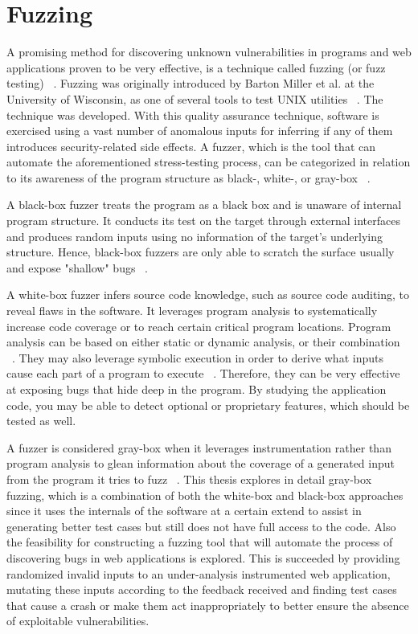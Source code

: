 \section{Fuzzing}
A promising method for discovering unknown vulnerabilities in
programs and web applications proven to be very effective, is a technique called fuzzing (or fuzz testing) ~\cite{fuzzing_def}. Fuzzing was originally introduced by Barton Miller et al. at the University of Wisconsin, as one of several tools to test UNIX utilities  ~\cite{mller1990fuzz}. The technique was developed. With this quality assurance technique, software is exercised using a vast number of anomalous inputs for inferring if any of them introduces security-related side effects. A fuzzer, which is the tool that can automate the aforementioned stress-testing process, can be categorized in relation to its awareness of the program structure as black-, white-, or gray-box ~\cite{fuzzing_book}. 

A black-box fuzzer treats the program as a black box and is unaware of
internal program structure. It conducts its test on the target through external
interfaces and produces random inputs using no information of the target's underlying structure. Hence,  black-box fuzzers are only able to scratch the surface usually and expose "shallow" bugs ~\cite{fuzzing_owasp}. 

A white-box fuzzer infers source code knowledge, such as source code auditing, to reveal
flaws in the software. It leverages program analysis to systematically
increase code coverage or to reach certain critical program locations. Program analysis can be based on either static or dynamic analysis, or their combination ~\cite{program_analysis_book}. They may also leverage symbolic execution in order to derive what inputs cause each part of a program to execute ~\cite{symbolic_exe}. Therefore, they can be very effective at exposing bugs that hide deep in the program. By studying the application code, you may be able to detect optional or proprietary features, which should be tested as well.

A fuzzer is considered gray-box when it leverages instrumentation rather than program analysis to glean information about the coverage of a generated input from the program it tries to fuzz ~\cite{zalewski2015american,efs2007}. This thesis explores in detail gray-box fuzzing, which is a combination of both the white-box and black-box approaches since it uses the internals of the software at a certain extend to assist in generating better test cases but still does not have full access to the code. Also the feasibility for constructing a fuzzing tool that will automate the process of discovering bugs in web applications is explored. This is succeeded by providing randomized invalid inputs to an under-analysis instrumented web application, mutating these inputs according to the feedback received and finding test cases that cause a crash or make them act inappropriately to better ensure the absence of exploitable vulnerabilities.

